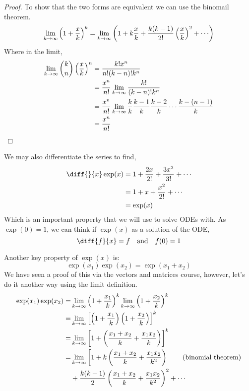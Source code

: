 \documentclass{article}
\begin{document}
\begin{proof}
    To show that the two forms are equivalent we can use the binomail theorem.\
    \begin{align*}
        \lim_{k \rightarrow \infty} \bkt{1 + \frac{x}{k}}^k = \lim_{k \rightarrow \infty} \bkt{1 + k \frac{x}{k} + \frac{k(k-1)}{2!}\bkt{\frac{x}{k}}^2 + \cdots} 
    \end{align*}
    Where in the limit,
    \begin{align*}
        \lim_{k \rightarrow \infty} \binom{k}{n} \left( \frac{x}{k} \right)^n &= \frac{k! x^n}{n!(k - n)! k^n} \\
        &= \frac{x^n}{n!} \lim_{k \rightarrow \infty} \frac{k!}{(k - n)! k^n} \\
        &= \frac{x^n}{n!} \lim_{k \rightarrow \infty} \frac{k}{k} \frac{k-1}{k} \frac{k-2}{k} \cdots \frac{k-(n -1)}{k} \\
        &= \frac{x^n}{n!}
    \end{align*}
\end{proof}

We may also differentiate the series to find,
\begin{align*}
    \diff{}{x}\exp(x) &= 1 + \frac{2x}{2!} + \frac{3x^2}{3!} + \cdots \\
    &= 1 + x + \frac{x^2}{2!} + \cdots \\
    &= \exp(x)
\end{align*}
Which is an important property that we will use to solve ODEs with. As $\exp(0) = 1$, we can think if $\exp(x)$ as a solution of the ODE,
\[
    \diff{f}{x} = f \quad \text{and} \quad f(0) = 1  
\]

Another key property of $\exp(x)$ is:
\[
    \exp(x_1)\exp(x_2) = \exp(x_1 + x_2)
\]
We have seen a proof of this via the vectors and matrices course, however, let's do it another way using the limit definition.
\begin{align*}
    \exp(x_1)\exp(x_2) =& \lim_{k \rightarrow \infty} \left( 1 + \frac{x_1}{k} \right)^k \lim_{k \rightarrow \infty} \left( 1 + \frac{x_2}{k} \right)^k \\
    =& \lim_{k \rightarrow \infty} \left[ \left( 1 + \frac{x_1}{k} \right) \left( 1 + \frac{x_2}{k} \right) \right]^k \\
    =& \lim_{k \rightarrow \infty} \left[ 1 + \left( \frac{x_1 + x_2}{k} + \frac{x_1x_2}{k} \right) \right]^k \\
    =& \lim_{k \rightarrow \infty} \left[1 + k\left( \frac{x_1 + x_2}{k} + \frac{x_1x_2}{k^2} \right)\right. \tag{binomial theorem}\\
    &+ \frac{k(k-1)}{2}\left( \frac{x_1 + x_2}{k} + \frac{x_1x_2}{k^2} \right)^2 + \cdots
\end{align*}
\end{document}
